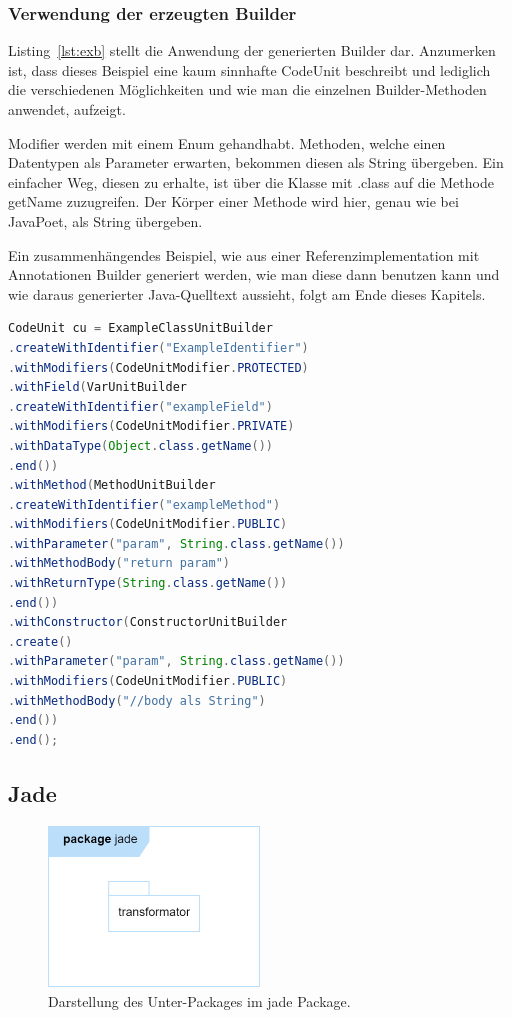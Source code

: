 \documentclass[12pt,oneside,a4paper,parskip]{scrbook}
\begin{document}
\subsubsection{Verwendung der erzeugten Builder}

Listing~\ref{lst:exb} stellt die Anwendung der generierten Builder dar. Anzumerken ist, dass dieses Beispiel eine kaum sinnhafte CodeUnit beschreibt und lediglich die verschiedenen Möglichkeiten und wie man die einzelnen Builder-Methoden anwendet, aufzeigt.

Modifier werden mit einem Enum gehandhabt. Methoden, welche einen Datentypen als Parameter erwarten, bekommen diesen als String übergeben. Ein einfacher Weg, diesen zu erhalte, ist über die Klasse mit .class auf die Methode getName zuzugreifen. Der Körper einer Methode wird hier, genau wie bei JavaPoet, als String übergeben.

Ein zusammenhängendes Beispiel, wie aus einer Referenzimplementation mit Annotationen Builder generiert werden, wie man diese dann benutzen kann und wie daraus generierter Java-Quelltext aussieht, folgt am Ende dieses Kapitels.

\begin{lstlisting}[label=lst:exb,
language=java,
firstnumber=1,
caption=Quelltext zur Verwendung verschiedener erzeugter Builder.]
CodeUnit cu = ExampleClassUnitBuilder
.createWithIdentifier("ExampleIdentifier")
.withModifiers(CodeUnitModifier.PROTECTED)
.withField(VarUnitBuilder
.createWithIdentifier("exampleField")
.withModifiers(CodeUnitModifier.PRIVATE)
.withDataType(Object.class.getName())
.end())
.withMethod(MethodUnitBuilder
.createWithIdentifier("exampleMethod")
.withModifiers(CodeUnitModifier.PUBLIC)
.withParameter("param", String.class.getName())
.withMethodBody("return param")
.withReturnType(String.class.getName())
.end())
.withConstructor(ConstructorUnitBuilder
.create()
.withParameter("param", String.class.getName())
.withModifiers(CodeUnitModifier.PUBLIC)
.withMethodBody("//body als String")
.end())
.end();
\end{lstlisting}

\subsection{Jade}

\begin{figure}[htbp]
\centering
\includegraphics[width=0.5\textwidth]{bilder/jade}
\caption{Darstellung des Unter-Packages im jade Package.}
\label{fig:jadePackages}
\end{figure}
\end{document}
